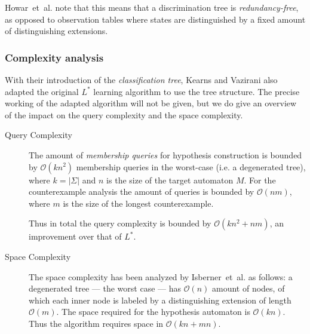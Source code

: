 \documentclass[multi,crop=false,class=article]{standalone}
\begin{document}
Howar~et~al. note that this means that a discrimination tree is
\textit{redundancy-free}, as opposed to observation tables where states are
distinguished by a fixed amount of distinguishing extensions\cite{Howar14}.

\subsubsection{Complexity analysis}
\label{sec:complexity-analysis}
With their introduction of the \textit{classification tree}, Kearns and Vazirani
also adapted the original $L^*$ learning algorithm to use the tree
structure\cite{Kearns94}. The precise working of the adapted algorithm will not
be given, but we do give an overview of the impact on the query complexity and
the space complexity.

\begin{description}
\item[Query Complexity] The amount of \textit{membership queries} for hypothesis
  construction is bounded by $\mathcal{O}(kn^2)$ membership queries in the
  worst-case (i.e. a degenerated tree)\cite{Howar14,Kearns94,Isberner14b}, where
  $k = |\Sigma |$ and $n$ is the size of the target automaton $M$. For the
  counterexample analysis the amount of queries is bounded by $\mathcal{O}(nm)$,
  where $m$ is the size of the longest counterexample\cite{Kearns94}.

  Thus in total the query complexity is bounded by $\mathcal{O}(kn^2 + nm)$, an
  improvement over that of $L^*$.
\item[Space Complexity] The space complexity has been analyzed by
  Isberner~et~al. as follows: a degenerated tree --- the worst case --- has
  $\mathcal{O}(n)$ amount of nodes, of which each inner node is labeled by a
  distinguishing extension of length $\mathcal{O}(m)$\cite{Isberner15}.  The
  space required for the hypothesis automaton is
  $\mathcal{O}(kn)$\cite{Isberner15}. Thus the algorithm requires space in
  $\mathcal{O}(kn + mn)$\cite{Isberner14b,Isberner15}.
\end{description}
\end{document}
